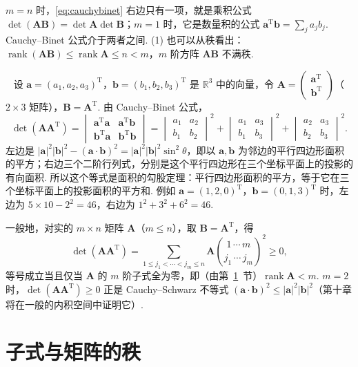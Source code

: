 \documentclass[lang=cn,10.5pt,scheme=chinese,toc=twocol,section,chinesefont=nofont,
twoside,citestyle=gb7714-2015,bibstyle=gb7714-2015]{elegantbook}
\DeclareRobustCommand{\textbf}[1]{{\lnsemiboldlatin\lnsemiboldcjk #1}}
\newcommand{\vv}[1]{\boldsymbol{#1}}
\newcommand{\trans}{\mathrm{T}}             %
\numberwithin{equation}{section}   %
\newcommand{\rk}{\operatorname{rank}}       %
\newcommand*{\lnlabel}[1]{{\sffamily\bfseries\color{black}#1}}
\renewenvironment{example}[1][]{%
	\refstepcounter{exam}%
	\par\noindent\lnlabel{\examplename\ \theexam\ifblank{#1}{}{\ #1}}\ \rmfamily}{%
	\par\ignorespacesafterend}
\begin{document}
$m=n$ 时，\eqref{eq:cauchybinet} 右边只有一项，就是乘积公式 $\det(\vv{AB})=\det\vv A\det\vv B$；$m=1$ 时，它是数量积的公式 $\vv a^\trans\vv b=\sum_ja_jb_j$. Cauchy–Binet 公式介于两者之间. (1) 也可以从秩看出：$\rk(\vv{AB})\le\rk\vv A\le n<m$，$m$ 阶方阵 $\vv{AB}$ 不满秩.

\begin{example}
  \label{eg:lagrangeid}
  设 $\vv a=(a_1,a_2,a_3)^\trans$，$\vv b=(b_1,b_2,b_3)^\trans$ 是 $\mathbb{R}^3$ 中的向量，令 $\vv A=
    \begin{pmatrix}
      \vv a^\trans \\\vv b^\trans
    \end{pmatrix}
  $（$2\times3$ 矩阵），$\vv B=\vv A^\trans$. 由 Cauchy–Binet 公式，
  \[
    \det(\vv A\vv A^\trans)=
    \begin{vmatrix}
      \vv a^\trans\vv a & \vv a^\trans\vv b \\\vv b^\trans\vv a&\vv b^\trans\vv b
    \end{vmatrix}
    =
    \begin{vmatrix}
      a_1 & a_2 \\b_1&b_2
    \end{vmatrix}
    ^2+
    \begin{vmatrix}
      a_1 & a_3 \\b_1&b_3
    \end{vmatrix}
    ^2+
    \begin{vmatrix}
      a_2 & a_3 \\b_2&b_3
    \end{vmatrix}
    ^2.
  \]
  左边是 $|\vv a|^2|\vv b|^2-(\vv a\cdot\vv b)^2=|\vv a|^2|\vv b|^2\sin^2\theta$，即以 $\vv a,\vv b$ 为邻边的平行四边形面积的平方；右边三个二阶行列式，分别是这个平行四边形在三个坐标平面上的投影的有向面积. 所以这个等式是\textbf{面积的勾股定理}：平行四边形面积的平方，等于它在三个坐标平面上的投影面积的平方和. 例如 $\vv a=(1,2,0)^\trans$，$\vv b=(0,1,3)^\trans$ 时，左边为 $5\times10-2^2=46$，右边为 $1^2+3^2+6^2=46$.
\end{example}

一般地，对实的 $m\times n$ 矩阵 $\vv A$（$m\le n$），取 $\vv B=\vv A^\trans$，得
\[
  \det(\vv A\vv A^\trans)=\sum_{1\le j_1<\cdots<j_m\le n}\vv A\binom{1\,\cdots\,m}{j_1\,\cdots\,j_m}^2\ge0,
\]
等号成立当且仅当 $\vv A$ 的 $m$ 阶子式全为零，即（由第~\ref{sec:minorrank}~节）$\rk\vv A<m$. $m=2$ 时，$\det(\vv A\vv A^\trans)\ge0$ 正是 Cauchy–Schwarz 不等式 $(\vv a\cdot\vv b)^2\le|\vv a|^2|\vv b|^2$（第十章将在一般的内积空间中证明它）.
\section{子式与矩阵的秩}\label{sec:minorrank}
\end{document}
